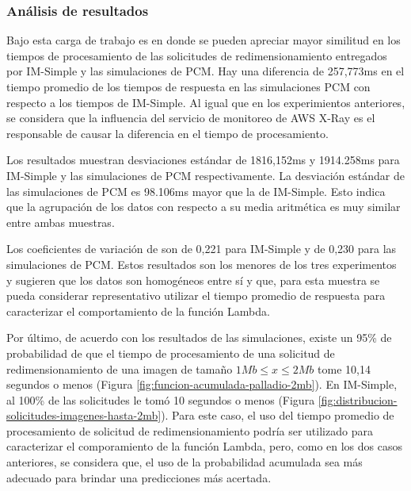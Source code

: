 \subsubsection{Análisis de resultados}
Bajo esta carga de trabajo es en donde se pueden apreciar mayor similitud en los tiempos de procesamiento de las solicitudes de redimensionamiento entregados por IM-Simple y las simulaciones de PCM. Hay una diferencia de 257,773ms en el tiempo promedio de los tiempos de respuesta en las simulaciones PCM con respecto a los tiempos de IM-Simple. Al igual que en los experimientos anteriores, se considera que la influencia del servicio de monitoreo de AWS X-Ray es el responsable de causar la diferencia en el tiempo de procesamiento.

Los resultados muestran desviaciones estándar de 1816,152ms y 1914.258ms para IM-Simple y las simulaciones de PCM respectivamente. La desviación estándar de las simulaciones de PCM es 98.106ms mayor que la de IM-Simple. Esto indica que la agrupación de los datos con respecto a su media aritmética es muy similar entre ambas muestras.

Los coeficientes de variación de son de 0,221 para IM-Simple y de 0,230 para las simulaciones de PCM. Estos resultados son los menores de los tres experimentos y sugieren que los datos son homogéneos entre sí y que, para esta muestra se pueda considerar representativo utilizar el tiempo promedio de respuesta para caracterizar el comportamiento de la función Lambda.


Por último, de acuerdo con los resultados de las simulaciones, existe un 95\% de probabilidad de que el tiempo de procesamiento de una solicitud de redimensionamiento de una imagen de tamaño $1Mb \leq x \leq 2Mb$ tome 10,14 segundos o menos (Figura \ref{fig:funcion-acumulada-palladio-2mb}). En IM-Simple, al 100\% de las solicitudes le tomó 10 segundos o menos (Figura \ref{fig:distribucion-solicitudes-imagenes-hasta-2mb}). Para este caso, el uso del tiempo promedio de procesamiento de solicitud de redimensionamiento podría ser utilizado para caracterizar el comporamiento de la función Lambda, pero, como en los dos casos anteriores, se considera que, el uso de la probabilidad acumulada sea más adecuado para brindar una predicciones más acertada.

